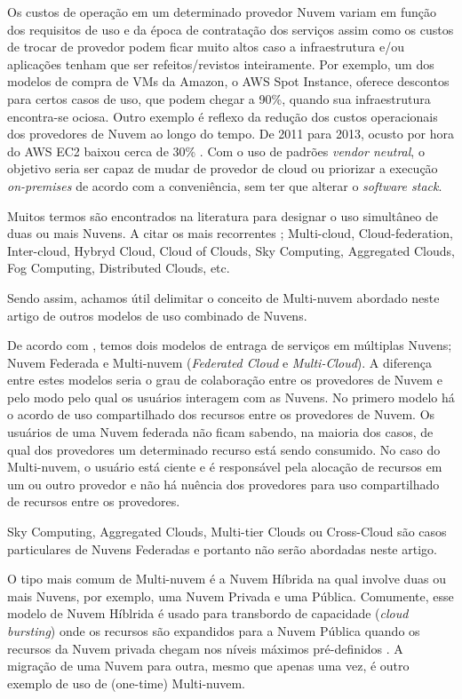 \documentclass[12pt]{article}
\begin{document}
	Os custos de operação em um determinado provedor Nuvem variam em função dos requisitos de uso e da época de contratação dos serviços assim como os custos de trocar de provedor podem ficar muito altos caso a infraestrutura e/ou aplicações tenham que ser refeitos/revistos inteiramente. Por exemplo, um dos modelos de compra de VMs da Amazon, o AWS Spot Instance, oferece descontos para certos casos de uso, que podem chegar a 90\%, quando sua infraestrutura encontra-se ociosa. Outro exemplo é reflexo da redução dos custos operacionais dos provedores de Nuvem ao longo do tempo. De 2011 para 2013, ocusto por hora do AWS EC2 baixou cerca de 30\% \cite{Golden:2013}. Com o uso de padrões \textit{vendor neutral}, o objetivo seria ser capaz de mudar de provedor de cloud ou priorizar a execução \textit{on-premises} de acordo com a conveniência, sem ter que alterar o \textit{software stack}.
	
	Muitos termos são encontrados na literatura para designar o uso simultâneo de duas ou mais Nuvens. A citar os mais recorrentes \cite{Ferrer:2012}; Multi-cloud, Cloud-federation, Inter-cloud, Hybryd Cloud, Cloud of Clouds, Sky Computing, Aggregated Clouds, Fog Computing, Distributed Clouds, etc.
	
	Sendo assim, achamos útil delimitar o conceito de Multi-nuvem abordado neste artigo de outros modelos de uso combinado de Nuvens.
	
	De acordo com \cite{Ferrer:2012}, temos dois modelos de entraga de serviços em múltiplas Nuvens; Nuvem Federada e Multi-nuvem (\textit{Federated Cloud} e \textit{Multi-Cloud}). A diferença entre estes modelos seria o grau de colaboração entre os provedores de Nuvem e pelo modo pelo qual os usuários interagem com as Nuvens. No primero modelo há o acordo de uso compartilhado dos recursos entre os provedores de Nuvem. Os usuários de uma Nuvem federada não ficam sabendo, na maioria dos casos, de qual dos provedores um determinado recurso está sendo consumido. No caso do Multi-nuvem, o usuário está ciente e é responsável pela alocação de recursos em um ou outro provedor e não há nuência dos provedores para uso compartilhado de recursos entre os provedores.
	
	Sky Computing, Aggregated Clouds, Multi-tier Clouds ou Cross-Cloud são casos particulares de Nuvens Federadas e portanto não serão abordadas neste artigo. 
	
	O tipo mais comum de Multi-nuvem é a Nuvem Híbrida na qual involve duas ou mais Nuvens, por exemplo, uma Nuvem Privada e uma Pública. Comumente, esse modelo de Nuvem Híblrida é usado para transbordo de capacidade (\textit{cloud bursting}) onde os recursos são expandidos para a Nuvem Pública quando os recursos da Nuvem privada chegam nos níveis máximos pré-definidos \cite{Ferrer:2012}. A migração de uma Nuvem para outra, mesmo que apenas uma vez, é outro exemplo de uso de (one-time) Multi-nuvem.
	
\end{document}
